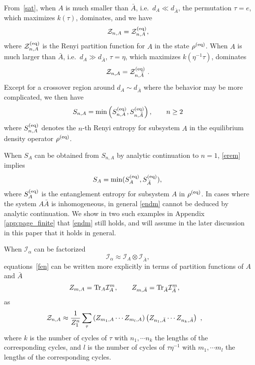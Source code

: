 \documentclass[a4paper,11pt]{article}
\newcommand{\be}{\begin{equation}}
\newcommand{\ee}{\end{equation}}
\def\ie{\begin{equation}\begin{aligned}}
\def\fe{\end{aligned}\end{equation}}
\newcommand\al{{\alpha}}
\newcommand\ov{\over}
\def\le{\left}
\def\ri{\right}
\newcommand\sI{{\ensuremath{{\mathcal I}}}}
\newcommand\sZ{{\mathcal Z}}
\begin{document}
From~\eqref{sat}, when $A$ is much smaller than $\bar A$, i.e.~$d_A \ll d_{\bar A}$, the permutation $\tau = e$, which maximizes $k (\tau)$, dominates, and we have 
\be
 \mathcal{Z}_{n, A} = \mathcal{Z}_{n, A}^{({\rm eq})},
 \ee
 where $ \mathcal{Z}_{n, A}^{({\rm eq})}$ is the Renyi partition function for $A$ in the state $\rho^{(\rm eq)}$. When $A$ is much larger than $\bar A$, i.e.~$d_A \gg d_{\bar A}$, $\tau = \eta$, which maximizes $k(\eta^{-1} \tau)$, dominates
 \be
 \mathcal{Z}_{n, A} = \mathcal{Z}_{n, \bar A}^{({\rm eq})} \ .
 \ee
 Except for a crossover region around $d_A \sim d_{\bar A}$ where the behavior may be more complicated, we
 then have 
 \
 \be \label{erem}
 S_{n,A} = {\rm min} \le(S_{n,A}^{\rm (eq)}, S_{n, \bar A}^{\rm (eq)} \ri), \qquad n \geq 2 
 \ee
where $S_{n,A}^{(\rm eq)}$ denotes the $n$-th Renyi entropy for subsystem $A$ in the equilibrium density operator $\rho^{(\rm eq)}$. %
 
 When $S_A$ can be obtained from $S_{n, A}$ by analytic continuation to $n=1$, \eqref{erem} implies 
 \be \label{endm}
 S_A = {\rm min} (S_A^{\rm (eq)}, S_{\bar A}^{\rm (eq)}) ,\, 
 \ee
where $S_A^{(\rm eq)}$ is the entanglement entropy for subsystem $A$ in $\rho^{(\rm eq)}$. In cases where the system $A\bar{A}$ is inhomogeneous, in general \eqref{endm} cannot be deduced by analytic continuation. We show in two such examples in Appendix \ref{app:page_finite} that \eqref{endm} still holds, and will assume in the later discussion in this paper that it holds in general. 


When $\sI_\al$ can be factorized
\be \label{gdn}
\sI_\al \approx \sI_{A} \otimes \sI_{\bar A} ,
\ee
equations~\eqref{fen} can be written more explicitly in terms of partition functions of $A$ and $\bar A$ 
\be 
Z_{m, A} = {\rm Tr}_A \sI_{A}^{m} , \qquad Z_{m, \bar A }= {\rm Tr}_{\bar A} \sI_{\bar A}^{m} , 
\quad 
\ee 
 as 
\ie \label{fen2}
 \sZ_{n, A} & \approx {1 \ov Z_1^n} \sum_\tau 
 \le( Z_{m_1, A} \cdots Z_{m_l, A} \ri) \le( Z_{n_1, \bar A} \cdots Z_{n_k, \bar A} \ri) \ ,
\fe
where $k$ is the number of cycles of $\tau$ with $n_1, \cdots n_k$ the lengths of the corresponding cycles,
and $l$ is the number of cycles of $\tau \eta^{-1}$ with $m_1, \cdots m_l$ the lengths of the corresponding cycles. 
\end{document}
